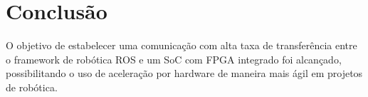 \chapter{Conclusão}

O objetivo de estabelecer uma comunicação com alta taxa de transferência entre o framework de robótica ROS e um SoC com FPGA integrado foi alcançado, possibilitando o uso de aceleração por hardware de maneira mais ágil em projetos de robótica.